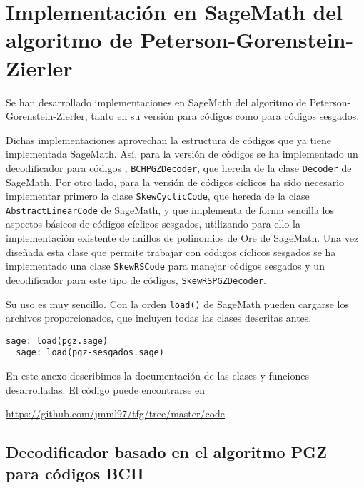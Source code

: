 \chapter[Implementación en SageMath del algoritmo PGZ]{Implementación en SageMath del algoritmo de Peterson-Gorenstein-Zierler}
\label{annex:pgz-sage}

Se han desarrollado implementaciones en SageMath del algoritmo de Peterson-Gorenstein-Zierler, tanto en su versión para códigos  como para códigos  sesgados.

Dichas implementaciones aprovechan la estructura de códigos que ya tiene implementada SageMath.
Así, para la versión de códigos  se ha implementado un decodificador para códigos , \texttt{BCHPGZDecoder}, que hereda de la clase \texttt{Decoder} de SageMath.
Por otro lado, para la versión de códigos cíclicos ha sido necesario implementar primero la clase \texttt{SkewCyclicCode}, que hereda de la clase \texttt{AbstractLinearCode} de SageMath, y que implementa de forma sencilla los aspectos básicos de códigos cíclicos sesgados, utilizando para ello la implementación existente de anillos de polinomios de Ore de SageMath.
Una vez diseñada esta clase que permite trabajar con códigos cíclicos sesgados se ha implementado una clase \texttt{SkewRSCode} para manejar códigos  sesgados y un decodificador para este tipo de códigos, \texttt{SkewRSPGZDecoder}.

Su uso es muy sencillo.
Con la orden \texttt{load()} de SageMath pueden cargarse los archivos proporcionados, que incluyen todas las clases descritas antes.

\begin{lstlisting}[gobble=2]
  sage: load(pgz.sage)
  sage: load(pgz-sesgados.sage)
\end{lstlisting}

En este anexo describimos la documentación de las clases y funciones desarrolladas.
El código puede encontrarse en
\begin{center}
  \url{https://github.com/jmml97/tfg/tree/master/code}
\end{center}

\section{Decodificador basado en el algoritmo PGZ para códigos BCH}


